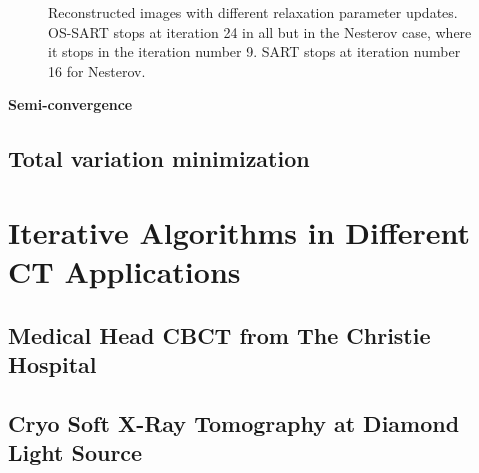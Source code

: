 \begin{figure}
\centering
{}
\caption[Reconstructed images with different relaxation parameter updates]{\label{fig:SARTlambdaplot}Reconstructed images with different relaxation parameter updates. OS-SART stops at iteration 24 in all but in the Nesterov case, where it stops in the iteration number 9. SART stops at iteration number 16 for Nesterov.}
\end{figure}


\textbf{Semi-convergence}

\subsection{Total variation minimization}


\section{Iterative Algorithms in Different CT Applications}
\subsection{Medical Head CBCT from  The Christie Hospital}
\subsection{Cryo Soft X-Ray Tomography at Diamond Light Source}